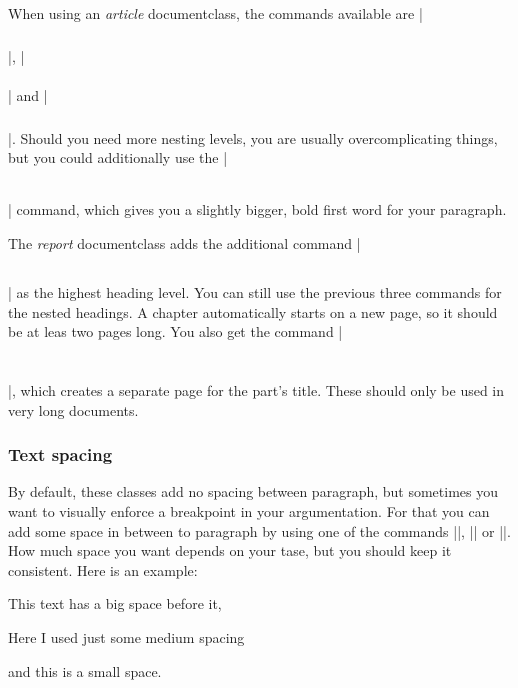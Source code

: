 		When using an \emph{article} documentclass, the commands available are |\section{}|, |\subsection{}| and
		|\subsubsection{}|. Should you need more nesting levels, you are usually overcomplicating things, but you could additionally use the
		|\paragraph{}| command, which gives you a slightly bigger, bold first word for your paragraph.

		The \emph{report} documentclass adds the additional command |\chapter{}| as the highest heading level. You can still use the previous
		three commands for the nested headings. A chapter automatically starts on a new page, so it should be at leas two pages long. You also get the
		command |\part{}|, which creates a separate page for the part's title. These should only be used in very long documents.

	\section{Text spacing} \label{sec: spacing}
		By default, these classes add no spacing between paragraph, but sometimes you want to visually enforce a breakpoint in your argumentation. For
		that you can add some space in between to paragraph by using one of the commands |\bigskip|, |\medskip| or
		|\smallskip|. How much space you want depends on your tase, but you should keep it consistent. Here is an example:

		\bigskip
		This text has a big space before it,

		\medskip
		Here I used just some medium spacing

		\smallskip
		and this is a small space.

